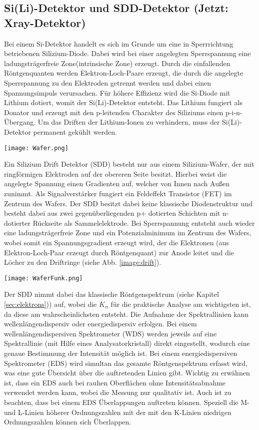 \subsection*{Si(Li)-Detektor und SDD-Detektor (Jetzt: Xray-Detektor)}
\label{sub:siliDetect}
Bei einem Si-Detektor handelt es sich im Grunde um eine in Sperrrichtung betriebenen Silizium-Diode. Dabei wird bei einer angelegten Sperrspannung eine ladungsträgerfreie Zone(intrinsische Zone) erzeugt. Durch die einfallenden Röntgenquanten werden Elektron-Loch-Paare erzeugt, die durch die angelegte Sperrspannung zu den Elektroden getrennt werden und dabei einen Spannungsimpuls verursachen. Für höhere Effizienz wird die Si-Diode mit Lithium dotiert, womit der Si(Li)-Detektor entsteht. Das Lithium fungiert als Donator und erzeugt mit den p-leitenden Charakter des Siliziums einen p-i-n-Übergang. Um das Driften der Lithium-Ionen zu verhindern, muss der Si(Li)-Detektor permanent gekühlt werden.
\begin{center}
    \texttt{[image: Wafer.png]}
    \label{image:sddDetect}
\end{center}
Ein Silizium Drift Detektor (SDD) besteht nur aus einem Silizium-Wafer, der mit ringförmigen Elektroden auf der obereren Seite besitzt. Hierbei weist die angelegte Spannung einen Gradienten auf, welcher von Innen nach Außen zunimmt. Als Signalverstärker fungiert ein Feldeffekt Transistor (FET) im Zentrum des Wafers. Der SDD besitzt dabei keine klassische Diodenstruktur und besteht dabei aus zwei gegenüberliegenden p+ dotierten Schichten mit n- dotierter Rückseite als Sammelelektrode. Bei Sperrspannung entsteht auch wieder eine ladungsträgerfreie Zone und ein Potenzialminimum im Zentrum des Wafers, wobei somit ein Spannungsgradient erzeugt wird, der die Elektronen (aus Elektron-Loch-Paar erzeugt durch Röntgenquant) zur Anode leitet und die Löcher zu den Driftringe (siehe Abb. \ref{image:drift}).
\begin{center}
    \texttt{[image: WaferFunk.png]}
    \label{image:drift}
\end{center}
Der SDD nimmt dabei das klassische Röntgenspektrum (siehe Kapitel \ref{sec:elektrons})) auf, wobei die $K_\alpha$ für die praktische Analyse am wichtigsten ist, da diese am wahrscheinlichsten entsteht. Die Aufnahme der Spektrallinien kann wellenlängendispersiv oder energiedispersiv erfolgen. Bei einem wellenlängendispersiven Spektrometer (WDS) werden jeweils auf eine Spektrallinie (mit Hilfe eines Analysatorkristall) direkt eingestellt, wodurch eine genaue Bestimmung der Intensität möglich ist. Bei einem energiedispersiven Spektrometer (EDS) wird simultan das gesamte Röntgenspektrum erfasst wird, was eine gute Übersicht über die auftretenden Linien gibt. Wichtig zu erwähnen ist, dass ein EDS auch bei rauhen Oberflächen ohne Intensitätsabnahme verwendet werden kann, wobei die Messung nur qualitativ ist. Auch ist zu beachten, dass bei einem EDS Überlappungen auftreten können. Speziell die M- und L-Linien höherer Ordnungszahlen mit der mit den K-Linien niedrigen Ordnungszahlen können sich Überlappen.\\

